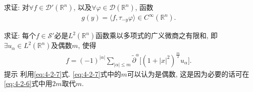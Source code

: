 \documentclass[../../main.tex]{subfiles}%
\begin{document}
\begin{example}
求证: 对$\forall f\in\mathscr{D}'(\mathbb R^n)$, 以及$\forall\varphi\in\mathscr{D}(\mathbb R^n)$, 函数
\begin{align*}
g(y)=\langle f,\tau_{-y}\varphi\rangle\in C^\infty(\mathbb R^n).
\end{align*}
\end{example}

\begin{example}
求证: 每个$f\in\mathscr{S}'$必是$L^2(\mathbb R^n)$函数乘以多项式的广义微商之有限和, 即$\exists u_\alpha\in L^2(\mathbb R^n)$及偶数$m$, 使得
\begin{align*}
f=(-1)^{|\alpha|}\sum\limits_{|\alpha|\leqslant m}\widetilde{\partial}^\alpha\big[(1+|x|^2)^{\frac{m}{2}}u_\alpha\big].
\end{align*}
提示 利用\eqref{eq:4-2-7}式. \eqref{eq:4-2-7}式中的$m$可以认为是偶数, 这是因为必要的话可在\eqref{eq:4-2-6}式中用$2m$取代$m$.
\end{example}
\end{document}

